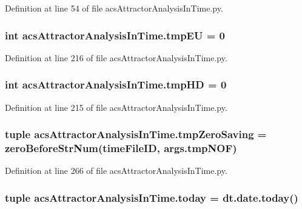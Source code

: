 Definition at line 54 of file acs\-Attractor\-Analysis\-In\-Time.\-py.

\hypertarget{a00092_a9019a56cfd992899ffc519204307a8ae}{
\subsubsection[{tmp\-E\-U}]{\setlength{\rightskip}{0pt plus 5cm}int acs\-Attractor\-Analysis\-In\-Time.\-tmp\-E\-U = 0}}\label{a00092_a9019a56cfd992899ffc519204307a8ae}


Definition at line 216 of file acs\-Attractor\-Analysis\-In\-Time.\-py.

\hypertarget{a00092_a35b7af9eb7cd962d33c5d56eae794c7b}{
\subsubsection[{tmp\-H\-D}]{\setlength{\rightskip}{0pt plus 5cm}int acs\-Attractor\-Analysis\-In\-Time.\-tmp\-H\-D = 0}}\label{a00092_a35b7af9eb7cd962d33c5d56eae794c7b}


Definition at line 215 of file acs\-Attractor\-Analysis\-In\-Time.\-py.

\hypertarget{a00092_ae86fc9dc3283934244ec28446445f722}{
\subsubsection[{tmp\-Zero\-Saving}]{\setlength{\rightskip}{0pt plus 5cm}tuple acs\-Attractor\-Analysis\-In\-Time.\-tmp\-Zero\-Saving = {\bf zero\-Before\-Str\-Num}(time\-File\-I\-D, args.\-tmp\-N\-O\-F)}}\label{a00092_ae86fc9dc3283934244ec28446445f722}


Definition at line 266 of file acs\-Attractor\-Analysis\-In\-Time.\-py.

\hypertarget{a00092_af30cd903eabfe4c9167f2a5d0062a4ce}{
\subsubsection[{today}]{\setlength{\rightskip}{0pt plus 5cm}tuple acs\-Attractor\-Analysis\-In\-Time.\-today = dt.\-date.\-today()}}\label{a00092_af30cd903eabfe4c9167f2a5d0062a4ce}


